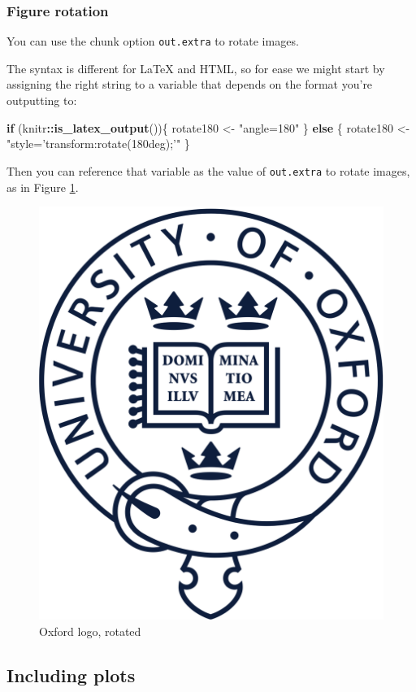 \documentclass[a4paper,nobind]{templates/ociamthesis}
\newenvironment{Shaded}{\begin{snugshade}}{\end{snugshade}}
\newcommand{\ControlFlowTok}[1]{\textcolor[rgb]{0.13,0.29,0.53}{\textbf{#1}}}
\newcommand{\KeywordTok}[1]{\textcolor[rgb]{0.13,0.29,0.53}{\textbf{#1}}}
\newcommand{\NormalTok}[1]{#1}
\newcommand{\OperatorTok}[1]{\textcolor[rgb]{0.81,0.36,0.00}{\textbf{#1}}}
\newcommand{\StringTok}[1]{\textcolor[rgb]{0.31,0.60,0.02}{#1}}
\renewenvironment{Shaded}
{
  \vspace{10pt}%
  \begin{snugshade}%
}{%
  \end{snugshade}%
  \vspace{8pt}%
}
\begin{document}
\subsubsection*{Figure rotation}\label{figure-rotation}

You can use the chunk option \texttt{out.extra} to rotate images.

The syntax is different for LaTeX and HTML, so for ease we might start
by assigning the right string to a variable that depends on the format
you're outputting to:

\begin{Shaded}
\begin{Highlighting}[]
\ControlFlowTok{if}\NormalTok{ (knitr}\OperatorTok{::}\KeywordTok{is_latex_output}\NormalTok{())\{}
\NormalTok{  rotate180 <-}\StringTok{ "angle=180"}
\NormalTok{\} }\ControlFlowTok{else}\NormalTok{ \{}
\NormalTok{  rotate180 <-}\StringTok{ "style='transform:rotate(180deg);'"}
\NormalTok{\}}
\end{Highlighting}
\end{Shaded}

Then you can reference that variable as the value of \texttt{out.extra}
to rotate images, as in Figure \ref{fig:oxford-logo-rotated}.

\begin{figure}

{\centering \includegraphics[width=0.5\linewidth,angle=180]{figures/sample-content/beltcrest} 

}

\caption{Oxford logo, rotated}\label{fig:oxford-logo-rotated}
\end{figure}

\subsection{Including plots}\label{including-plots}
\end{document}
